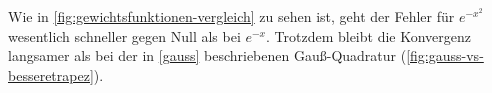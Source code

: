 \documentclass[12pt,a4paper]{scrartcl}
\numberwithin{equation}{section}
\numberwithin{myalgctr}{section}
\numberwithin{mytheoremctr}{subsection}
\numberwithin{mykorollarctr}{subsection}
\numberwithin{mylemmactr}{subsection}
\numberwithin{mybeispielctr}{subsection}
\begin{document}
	Wie in \cref{fig:gewichtsfunktionen-vergleich} zu sehen ist, geht der Fehler f\"ur $e^{-x^2}$ wesentlich schneller gegen Null als bei $e^{-x}$. Trotzdem bleibt die Konvergenz langsamer als bei der in \cref{gauss} beschriebenen Gau\ss -Quadratur (\cref{fig:gauss-vs-besseretrapez}).


	\newpage
	\printbibliography
	\listoffigures
	\thispagestyle{firststyle}
	
\end{document}
